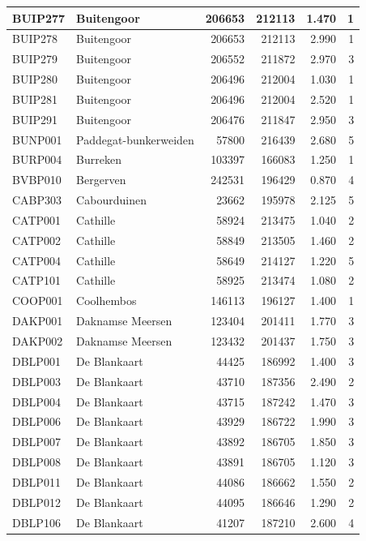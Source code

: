 \documentclass[11pt,]{book}
\begin{document}
\begin{table}
\begin{tabular}[t]{l|l|r|r|r|r}
\hline
BUIP277 & Buitengoor & 206653 & 212113 & 1.470 & 1\\
\hline
BUIP278 & Buitengoor & 206653 & 212113 & 2.990 & 1\\
\hline
BUIP279 & Buitengoor & 206552 & 211872 & 2.970 & 3\\
\hline
BUIP280 & Buitengoor & 206496 & 212004 & 1.030 & 1\\
\hline
BUIP281 & Buitengoor & 206496 & 212004 & 2.520 & 1\\
\hline
BUIP291 & Buitengoor & 206476 & 211847 & 2.950 & 3\\
\hline
BUNP001 & Paddegat-bunkerweiden & 57800 & 216439 & 2.680 & 5\\
\hline
BURP004 & Burreken & 103397 & 166083 & 1.250 & 1\\
\hline
BVBP010 & Bergerven & 242531 & 196429 & 0.870 & 4\\
\hline
CABP303 & Cabourduinen & 23662 & 195978 & 2.125 & 5\\
\hline
CATP001 & Cathille & 58924 & 213475 & 1.040 & 2\\
\hline
CATP002 & Cathille & 58849 & 213505 & 1.460 & 2\\
\hline
CATP004 & Cathille & 58649 & 214127 & 1.220 & 5\\
\hline
CATP101 & Cathille & 58925 & 213474 & 1.080 & 2\\
\hline
COOP001 & Coolhembos & 146113 & 196127 & 1.400 & 1\\
\hline
DAKP001 & Daknamse Meersen & 123404 & 201411 & 1.770 & 3\\
\hline
DAKP002 & Daknamse Meersen & 123432 & 201437 & 1.750 & 3\\
\hline
DBLP001 & De Blankaart & 44425 & 186992 & 1.400 & 3\\
\hline
DBLP003 & De Blankaart & 43710 & 187356 & 2.490 & 2\\
\hline
DBLP004 & De Blankaart & 43715 & 187242 & 1.470 & 3\\
\hline
DBLP006 & De Blankaart & 43929 & 186722 & 1.990 & 3\\
\hline
DBLP007 & De Blankaart & 43892 & 186705 & 1.850 & 3\\
\hline
DBLP008 & De Blankaart & 43891 & 186705 & 1.120 & 3\\
\hline
DBLP011 & De Blankaart & 44086 & 186662 & 1.550 & 2\\
\hline
DBLP012 & De Blankaart & 44095 & 186646 & 1.290 & 2\\
\hline
DBLP106 & De Blankaart & 41207 & 187210 & 2.600 & 4\\

\end{tabular}
\end{table}
\end{document}
